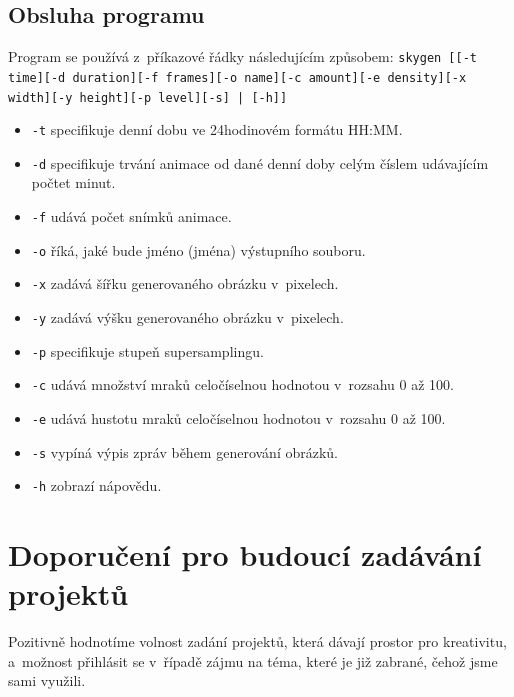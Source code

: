 \documentclass[12pt,a4paper,titlepage,final]{report}
\begin{document}
\section{Obsluha programu}

Program se používá z~příkazové řádky následujícím způsobem:
{\tt skygen [[-t time][-d duration][-f frames][-o name][-c amount][-e density][-x width][-y height][-p level][-s] | [-h]]}

\begin{itemize}
\item {\tt -t} specifikuje denní dobu ve 24hodinovém formátu {HH:MM}.
\item {\tt -d} specifikuje trvání animace od dané denní doby celým číslem udávajícím počtet minut.
\item {\tt -f} udává počet snímků animace.
\item {\tt -o} říká, jaké bude jméno (jména) výstupního souboru.
\item {\tt -x} zadává šířku generovaného obrázku v~pixelech.
\item {\tt -y} zadává výšku generovaného obrázku v~pixelech.
\item {\tt -p} specifikuje stupeň supersamplingu.
\item {\tt -c} udává množství mraků celočíselnou hodnotou v~rozsahu 0 až 100.
\item {\tt -e} udává hustotu mraků celočíselnou hodnotou v~rozsahu 0 až 100.
\item {\tt -s} vypíná výpis zpráv během generování obrázků.
\item {\tt -h} zobrazí nápovědu.
\end{itemize}

\chapter{Doporučení pro budoucí zadávání projektů}

Pozitivně hodnotíme volnost zadání projektů, která dávají prostor pro
kreativitu, a~možnost přihlásit se v~řípadě zájmu na téma, které je již
zabrané, čehož jsme sami využili.




\nocite{cite1}
\nocite{cite2}
\nocite{cite3}


\end{document}
